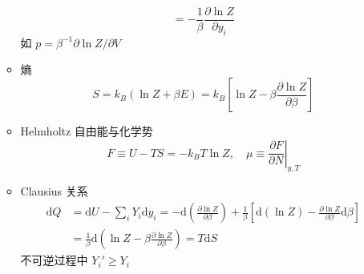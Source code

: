 \documentclass[12pt,a4paper]{article}%
\numberwithin{equation}{section}
\newcommand{\dif}{\mathrm{d}}
\begin{document}
\begin{enumerate}
\begin{itemize}
\begin{equation}
             = -\frac 1\beta \frac{\partial\ln Z}{\partial y_i}
        \end{equation}
        如 $p = \beta^{-1}\partial\ln Z/\partial V$
        \item 熵
        \begin{equation}
            S = k_B\left(\ln Z + \beta E\right) 
            = k_B\left[\ln Z - \beta\frac{\partial \ln Z}{\partial \beta}\right]
        \end{equation}
        \item Helmholtz 自由能与化学势
        \begin{equation}
            F\equiv U-TS = -k_BT\ln Z,\quad
            \mu\equiv\left.\frac{\partial F}{\partial N}\right|_{y,T}
        \end{equation}
        \item Clausius 关系
        \begin{align}
            \dif Q &= \dif U - \sum_i Y_i\dif y_i 
            = -\dif\left(\frac{\partial\ln Z}{\partial \beta}\right) 
            + \frac 1\beta\left[\dif(\ln Z) - \frac{\partial\ln Z}{\partial \beta}\dif\beta\right] \nonumber \\
            &=\frac1\beta\dif\left(\ln Z - \beta\frac{\partial\ln Z}{\partial\beta}\right) = T\dif S
        \end{align}
        不可逆过程中 $Y_i'\ge Y_i$
    \end{itemize}
\end{enumerate}
\end{document}
